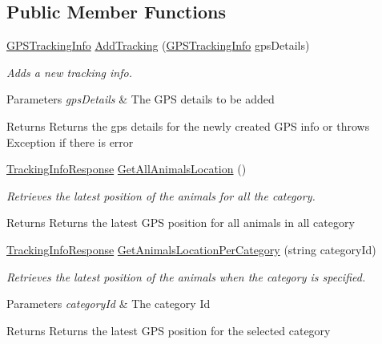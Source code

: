 \subsection*{Public Member Functions}
\begin{DoxyCompactItemize}
\item 
\hyperlink{classWildLifeTracker_1_1Models_1_1GPSTrackingInfo}{G\+P\+S\+Tracking\+Info} \hyperlink{interfaceWildLifeTracker_1_1Services_1_1ITrackingInfoService_a25bb0b990b8fd5649a97a10d14faecd2}{Add\+Tracking} (\hyperlink{classWildLifeTracker_1_1Models_1_1GPSTrackingInfo}{G\+P\+S\+Tracking\+Info} gps\+Details)
\begin{DoxyCompactList}\small\item\em Adds a new tracking info. 
\begin{DoxyParams}{Parameters}
{\em gps\+Details} & The G\+PS details to be added\\
\hline
\end{DoxyParams}
\begin{DoxyReturn}{Returns}
Returns the gps details for the newly created G\+PS info or throws Exception if there is error
\end{DoxyReturn}
\end{DoxyCompactList}\item 
\hyperlink{classWildLifeTracker_1_1Response_1_1TrackingInfoResponse}{Tracking\+Info\+Response} \hyperlink{interfaceWildLifeTracker_1_1Services_1_1ITrackingInfoService_a858073f81f74fcdf93b69fe464b13e84}{Get\+All\+Animals\+Location} ()
\begin{DoxyCompactList}\small\item\em Retrieves the latest position of the animals for all the category. \begin{DoxyReturn}{Returns}
Returns the latest G\+PS position for all animals in all category
\end{DoxyReturn}
\end{DoxyCompactList}\item 
\hyperlink{classWildLifeTracker_1_1Response_1_1TrackingInfoResponse}{Tracking\+Info\+Response} \hyperlink{interfaceWildLifeTracker_1_1Services_1_1ITrackingInfoService_af4b4cf67d3e3a8ec3e01041262c8f13a}{Get\+Animals\+Location\+Per\+Category} (string category\+Id)
\begin{DoxyCompactList}\small\item\em Retrieves the latest position of the animals when the category is specified. 
\begin{DoxyParams}{Parameters}
{\em category\+Id} & The category Id\\
\hline
\end{DoxyParams}
\begin{DoxyReturn}{Returns}
Returns the latest G\+PS position for the selected category
\end{DoxyReturn}
\end{DoxyCompactList}\end{DoxyCompactItemize}


